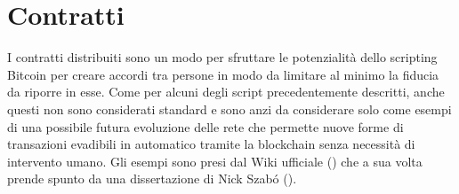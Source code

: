 \section{Contratti}\label{contratti}

I contratti distribuiti sono un modo per sfruttare le potenzialità dello scripting Bitcoin per creare accordi tra persone in modo da limitare al minimo la fiducia da riporre in esse. Come per alcuni degli script precedentemente descritti, anche questi non sono considerati standard e sono anzi da considerare solo come esempi di una possibile futura evoluzione delle rete che permette nuove forme di transazioni evadibili in automatico tramite la blockchain senza necessità di intervento umano. Gli esempi sono presi dal Wiki ufficiale (\cite{bitcoin-contracts}) che a sua volta prende spunto da una dissertazione di Nick Szab\'{o} (\cite{nick-szabo}).\\

